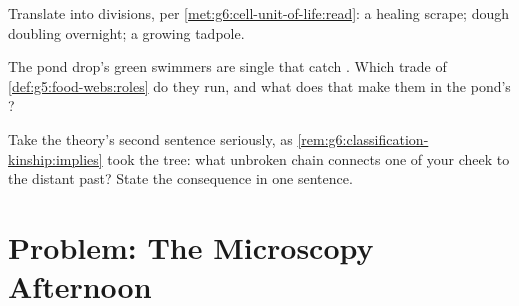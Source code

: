 \begin{exercise}[$\star\star$]\label{exo:g6:cell-unit-of-life:10}
Translate into  divisions, per
\cref{met:g6:cell-unit-of-life:read}: a healing scrape;
dough doubling overnight; a growing tadpole.
\end{exercise}

\begin{exercise}[$\star\star$]\label{exo:g6:cell-unit-of-life:11}
The pond drop's green swimmers are single  that
catch . Which trade of
\cref{def:g5:food-webs:roles} do they run, and what does
that make them in the pond's ?
\end{exercise}

\begin{exercise}[$\star\star\star$]\label{exo:g6:cell-unit-of-life:12}
Take the  theory's second sentence seriously, as
\cref{rem:g6:classification-kinship:implies} took the
tree: what unbroken chain connects one of your cheek
 to the distant past? State the consequence in one
sentence.
\end{exercise}

\section{Problem: The Microscopy Afternoon}


